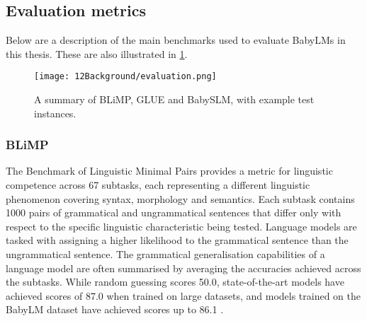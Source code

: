 
\subsection{Evaluation metrics}\label{sec:12-evaluation}

Below are a description of the main benchmarks used to evaluate BabyLMs in this thesis. These are also illustrated in \cref{fig:12-evaluation}.

\begin{figure}[t]
    \centering
    \texttt{[image: 12Background/evaluation.png]}
    \caption{A summary of BLiMP, GLUE and BabySLM, with example test instances.}
    \label{fig:12-evaluation}
\end{figure}

\subsubsection{BLiMP}\label{sec:12-blimp}

The Benchmark of Linguistic Minimal Pairs \citep[BLiMP][]{warstadt-2020-blimp} provides a metric for linguistic competence across 67 subtasks, each representing a different linguistic phenomenon covering syntax, morphology and semantics. Each subtask contains 1000 pairs of grammatical and ungrammatical sentences that differ only with respect to the specific linguistic characteristic being tested. Language models are tasked with assigning a higher likelihood to the grammatical sentence than the ungrammatical sentence. The grammatical generalisation capabilities of a language model are often summarised by averaging the accuracies achieved across the subtasks. While random guessing scores 50.0, state-of-the-art models have achieved scores of 87.0 when trained on large datasets, and models trained on the BabyLM dataset have achieved scores up to 86.1 \citep{hu-etal-2024-findings}. 

